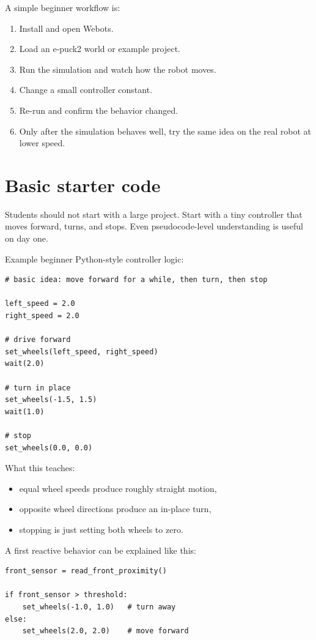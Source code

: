 \documentclass[11pt]{article}
\begin{document}
A simple beginner workflow is:
\begin{enumerate}
  \item Install and open Webots.
  \item Load an e-puck2 world or example project.
  \item Run the simulation and watch how the robot moves.
  \item Change a small controller constant.
  \item Re-run and confirm the behavior changed.
  \item Only after the simulation behaves well, try the same idea on the real robot at lower speed.
\end{enumerate}

\section{Basic starter code}
Students should not start with a large project. Start with a tiny controller that moves forward, turns, and stops. Even pseudocode-level understanding is useful on day one.

Example beginner Python-style controller logic:
\begin{verbatim}
# basic idea: move forward for a while, then turn, then stop

left_speed = 2.0
right_speed = 2.0

# drive forward
set_wheels(left_speed, right_speed)
wait(2.0)

# turn in place
set_wheels(-1.5, 1.5)
wait(1.0)

# stop
set_wheels(0.0, 0.0)
\end{verbatim}

What this teaches:
\begin{itemize}
  \item equal wheel speeds produce roughly straight motion,
  \item opposite wheel directions produce an in-place turn,
  \item stopping is just setting both wheels to zero.
\end{itemize}

A first reactive behavior can be explained like this:
\begin{verbatim}
front_sensor = read_front_proximity()

if front_sensor > threshold:
    set_wheels(-1.0, 1.0)   # turn away
else:
    set_wheels(2.0, 2.0)    # move forward
\end{verbatim}
\end{document}
